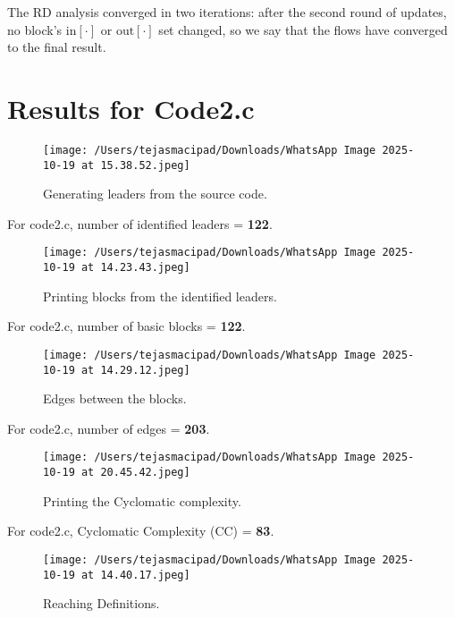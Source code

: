 \documentclass[12pt, a4paper]{report}
\begin{document}
\noindent
The RD analysis converged in two iterations: after the second round of updates, no block’s \(\mathrm{in}[\cdot]\) or \(\mathrm{out}[\cdot]\) set changed, so we say that the flows have converged to the final result.


\clearpage
\section{Results for Code2.c}

\begin{figure}[H]
\centering
\texttt{[image: /Users/tejasmacipad/Downloads/WhatsApp Image 2025-10-19 at 15.38.52.jpeg]}
\caption{Generating leaders from the source code.}
\label{fig:diff-example-71}
\end{figure}

\noindent For code2.c, number of identified leaders = \textbf{122}.

\begin{figure}[H]
\centering
\texttt{[image: /Users/tejasmacipad/Downloads/WhatsApp Image 2025-10-19 at 14.23.43.jpeg]}
\caption{Printing blocks from the identified leaders.}
\label{fig:diff-example-72}
\end{figure}

\noindent For code2.c, number of basic blocks = \textbf{122}.

\begin{figure}[H]
\centering
\texttt{[image: /Users/tejasmacipad/Downloads/WhatsApp Image 2025-10-19 at 14.29.12.jpeg]}
\caption{Edges between the blocks.}
\label{fig:diff-example-73}
\end{figure}

\noindent For code2.c, number of edges = \textbf{203}.

\begin{figure}[H]
\centering
\texttt{[image: /Users/tejasmacipad/Downloads/WhatsApp Image 2025-10-19 at 20.45.42.jpeg]}
\caption{Printing the Cyclomatic complexity.}
\label{fig:diff-example-74}
\end{figure}

\noindent For code2.c, Cyclomatic Complexity (CC) = \textbf{83}.

\begin{figure}[H]
\centering
\texttt{[image: /Users/tejasmacipad/Downloads/WhatsApp Image 2025-10-19 at 14.40.17.jpeg]}
\caption{Reaching Definitions.}
\label{fig:diff-example-75}
\end{figure}
\end{document}
